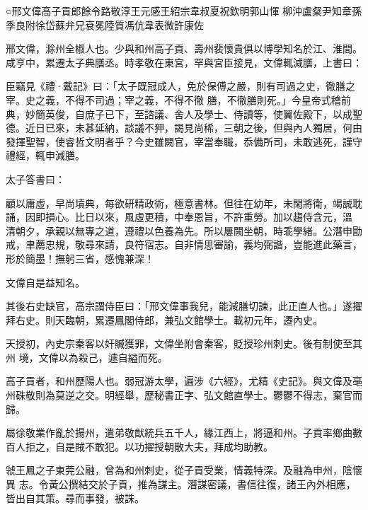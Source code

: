 
\begin{pinyinscope}

 ○邢文偉高子貢郎餘令路敬淳王元感王紹宗韋叔夏祝欽明郭山惲
 柳沖盧粲尹知章孫季良附徐岱蘇弁兄袞冕陸質馮伉韋表微許康佐



 邢文偉，滁州全椒人也。少與和州高子貢、壽州裴懷貴俱以博學知名於江、淮間。咸亨中，累遷太子典膳丞。時孝敬在東宮，罕與宮臣接見，文偉輒減膳，上書曰：



 臣竊見《禮·戴記》曰：「太子既冠成人，免於保傅之嚴，則有司過之史，徹膳之宰。史之義，不得不司過；宰之義，不得不徹
 膳，不徹膳則死。」今皇帝式稽前典，妙簡英俊，自庶子已下，至諮議、舍人及學士、侍讀等，使翼佐殿下，以成聖德。近日已來，未甚延納，談議不狎，謁見尚稀，三朝之後，但與內人獨居，何由發揮聖智，使睿哲文明者乎？今史雖闕官，宰當奉職，忝備所司，未敢逃死，謹守禮經，輒申減膳。



 太子答書曰：



 顧以庸虛，早尚墳典，每欲研精政術，極意書林。但往在幼年，未閑將衛，竭誠耽誦，因即損心。比日以來，風虛更積，中奉恩旨，不許重勞。加以趨侍含元，溫
 清朝夕，承親以無專之道，遵禮以色養為先。所以屢闕坐朝，時乖學緒。公潛申勖戒，聿薦忠規，敬尋來請，良符宿志。自非情思審諭，義均弼諧，豈能進此藥言，形於簡墨！撫躬三省，感愧兼深！



 文偉自是益知名。



 其後右史缺官，高宗謂侍臣曰：「邢文偉事我兒，能減膳切諫，此正直人也。」遂擢拜右史。則天臨朝，累遷鳳閣侍郎，兼弘文館學士。載初元年，遷內史。



 天授初，內史宗秦客以奸贓獲罪，文偉坐附會秦客，貶授珍州刺史。後有制使至其州
 境，文偉以為殺己，遽自縊而死。



 高子貢者，和州歷陽人也。弱冠游太學，遍涉《六經》，尤精《史記》。與文偉及亳州硃敬則為莫逆之交。明經舉，歷秘書正字、弘文館直學士。鬱鬱不得志，棄官而歸。



 屬徐敬業作亂於揚州，遣弟敬猷統兵五千人，緣江西上，將逼和州。子貢率鄉曲數百人拒之，自是賊不敢犯。以功擢授朝散大夫，拜成均助教。



 虢王鳳之子東莞公融，曾為和州刺史，從子貢受業，情義特深。及融為申州，陰懷異
 志。令黃公撰結交於子貢，推為謀主。潛謀密議，書信往復，諸王內外相應，皆出自其策。尋而事發，被誅。




\end{pinyinscope}
